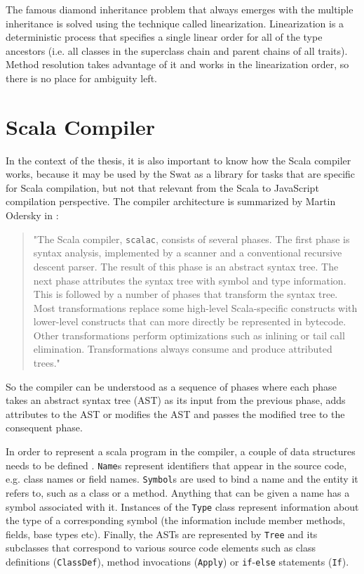 \documentclass[12pt,a4paper]{report}
\begin{document}
The famous diamond inheritance problem that always emerges with the multiple inheritance is solved using the technique called linearization\cite{Linearization}. Linearization is a deterministic process that specifies a single linear order for all of the type ancestors (i.e. all classes in the superclass chain and parent chains of all traits). Method resolution takes advantage of it and works in the linearization order, so there is no place for ambiguity left.

\section{Scala Compiler}
\label{sec:ScalaCompiler}

In the context of the thesis, it is also important to know how the Scala compiler works, because it may be used by the Swat as a library for tasks that are specific for Scala compilation, but not that relevant from the Scala to JavaScript compilation perspective. The compiler architecture is summarized by Martin Odersky in \cite{ScalableComponents}:

\begin{quote}
"The Scala compiler, \texttt{scalac}, consists of several phases. The first phase is syntax analysis, implemented by a scanner and a conventional recursive descent parser. The result of this phase is an abstract syntax tree. The next phase attributes the syntax tree with symbol and type information. This is followed by a number of phases that transform the syntax tree. Most transformations replace some high-level Scala-specific constructs with lower-level constructs that can more directly be represented in bytecode. Other transformations perform optimizations such as inlining or tail call elimination. Transformations always consume and produce attributed trees."
\end{quote}

So the compiler can be understood as a sequence of phases where each phase takes an abstract syntax tree (AST) as its input from the previous phase, adds attributes to the AST or modifies the AST and passes the modified tree to the consequent phase.

In order to represent a scala program in the compiler, a couple of data structures needs to be defined\cite{Reflection}
. \texttt{Name}s represent identifiers that appear in the source code, e.g. class names or field names. \texttt{Symbol}s are used to bind a name and the entity it refers to, such as a class or a method. Anything that can be given a name has a symbol associated with it. Instances of the \texttt{Type} class represent information about the type of a corresponding symbol (the information include member methods, fields, base types etc). Finally, the ASTs are represented by \texttt{Tree} and its subclasses that correspond to various source code elements such as class definitions (\texttt{ClassDef}), method invocations (\texttt{Apply}) or \texttt{if}-\texttt{else} statements (\texttt{If}).
\end{document}
